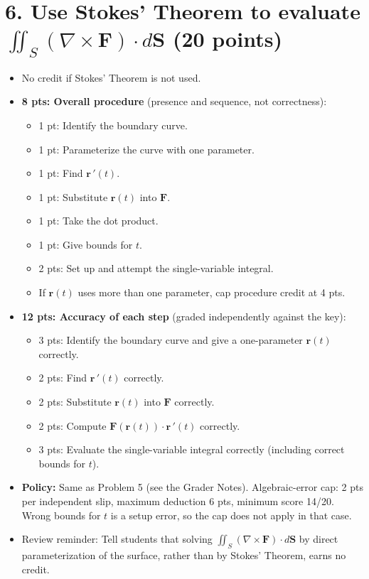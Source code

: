 \documentclass[11pt,letterpaper]{article}
\newcommand{\curl}{\nabla\times}
\renewcommand{\vec}[1]{\mathbf{#1}}
\begin{document}
\section*{6. Use Stokes' Theorem to evaluate $\displaystyle\iint_S (\curl\vec F)\cdot d\vec S$ (20 points)}
\begin{itemize}
  \item No credit if Stokes' Theorem is not used.
  \item \textbf{8 pts: Overall procedure} (presence and sequence, not correctness):
  \begin{itemize}
    \item 1 pt: Identify the boundary curve.
    \item 1 pt: Parameterize the curve with one parameter.
    \item 1 pt: Find $\vec r\,'(t)$.
    \item 1 pt: Substitute $\vec r(t)$ into $\vec F$.
    \item 1 pt: Take the dot product.
    \item 1 pt: Give bounds for $t$.
    \item 2 pts: Set up and attempt the single-variable integral.
    \item If $\vec r(t)$ uses more than one parameter, cap procedure credit at 4 pts.
  \end{itemize}
  \item \textbf{12 pts: Accuracy of each step} (graded independently against the key):
  \begin{itemize}
    \item 3 pts: Identify the boundary curve and give a one-parameter $\vec r(t)$ correctly.
    \item 2 pts: Find $\vec r\,'(t)$ correctly.
    \item 2 pts: Substitute $\vec r(t)$ into $\vec F$ correctly.
    \item 2 pts: Compute $\vec F(\vec r(t))\cdot\vec r\,'(t)$ correctly.
    \item 3 pts: Evaluate the single-variable integral correctly (including correct bounds for $t$).
  \end{itemize}
  \item \textbf{Policy:} Same as Problem 5 (see the Grader Notes). Algebraic-error cap: 2 pts per independent slip, maximum deduction 6 pts, minimum score 14/20. Wrong bounds for $t$ is a setup error, so the cap does not apply in that case.
  \item Review reminder: Tell students that solving $\iint_S(\curl\vec F)\cdot d\vec S$ by direct parameterization of the surface, rather than by Stokes' Theorem, earns no credit.
\end{itemize}
 
\end{document}
